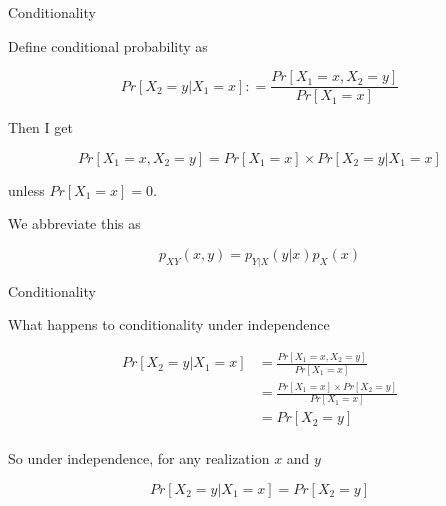 \documentclass{beamer}\usepackage[]{graphicx}\usepackage[]{color}
\begin{document}
\begin{frame}[fragile]{Conditionality \;\;}

Define conditional probability as 

$$ Pr[X_2 = y | X_1 = x] : =  \frac{Pr [X_1 = x, X_2 = y]} {Pr [X_1 =x]} $$

Then I get 

$$ Pr [ X_1 = x, X_2 = y] = Pr [X_1 = x] \times Pr[X_2 = y | X_1 = x] $$

unless $ Pr [X_1 =x] = 0$.

We abbreviate this as 

$$ p_{XY}(x,y) = p_{Y|X}(y|x) p_{X}(x) $$

\end{frame}

\begin{frame}[fragile]{Conditionality \;\;}

What happens to conditionality under independence 

\begin{align}
Pr [X_2 = y | X_1 =x ] & = \frac{Pr [X_1 = x, X_2 = y]} {Pr [X_1 =x]} \\
& = \frac{Pr [X_1 = x] \times Pr [X_2 =y]}{ Pr [X_1 = x]} \\
& = Pr[ X_2 = y] \\
\end{align}

So under independence, for any realization $x$ and $y$

$$ Pr [X_2 = y | X_1 =x ] = Pr[X_2 = y] $$

\end{frame}
\end{document}
